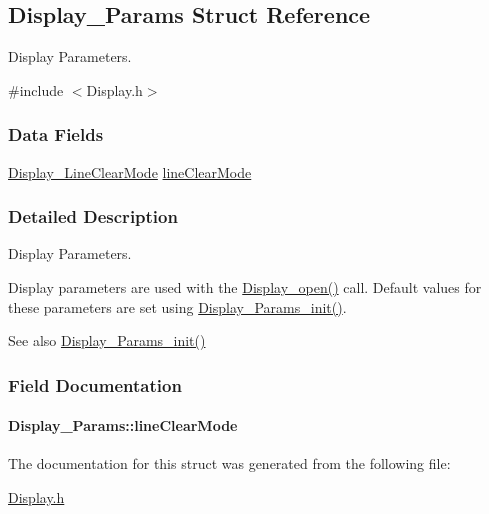 \subsection{Display\+\_\+\+Params Struct Reference}
\label{struct_display___params}


Display Parameters.  




{\ttfamily \#include $<$Display.\+h$>$}

\subsubsection*{Data Fields}
\begin{DoxyCompactItemize}
\item 
\hyperlink{_display_8h_a3d9ab99875c344491227a76f1d47e377}{Display\+\_\+\+Line\+Clear\+Mode} \hyperlink{struct_display___params_af442a90969018ed8073eef6451425f40}{line\+Clear\+Mode}
\end{DoxyCompactItemize}


\subsubsection{Detailed Description}
Display Parameters. 

Display parameters are used with the \hyperlink{_display_8h_a3aa87973a354d4fd6a2969f764e8afe6}{Display\+\_\+open()} call. Default values for these parameters are set using \hyperlink{_display_8h_a4fb2982f52995a80194fbb107883a183}{Display\+\_\+\+Params\+\_\+init()}.

\begin{DoxySeeAlso}{See also}
\hyperlink{_display_8h_a4fb2982f52995a80194fbb107883a183}{Display\+\_\+\+Params\+\_\+init()} 
\end{DoxySeeAlso}


\subsubsection{Field Documentation}
\paragraph[{line\+Clear\+Mode}]{ Display\+\_\+\+Params\+::line\+Clear\+Mode}\label{struct_display___params_af442a90969018ed8073eef6451425f40}


The documentation for this struct was generated from the following file\+:\begin{DoxyCompactItemize}
\item 
\hyperlink{_display_8h}{Display.\+h}\end{DoxyCompactItemize}
